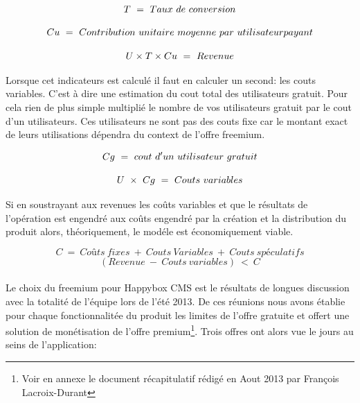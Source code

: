 \documentclass[11pt, a4paper ]{article}
\begin{document}
\begin{spacing}{1.5}
\begin{equation}\index{T!définition}
	T\ =\ Taux\ de\ conversion
\end{equation}


\begin{equation} \index{Cu!définition}
	Cu\ =\ Contribution\ unitaire\ moyenne\ par\ utilisateur payant
\end{equation}


\begin{equation}\index{Revenue!définition}
	U \times T \times Cu\ =\ Revenue
\end{equation}

Lorsque cet indicateurs est calculé il faut en calculer un second: les couts variables. C'est à dire une estimation du cout total des utilisateurs gratuit. Pour cela rien de plus simple multiplié le nombre de vos utilisateurs gratuit par le cout d'un utilisateurs. Ces utilisateurs ne sont pas des couts fixe car le montant exact de leurs utilisations dépendra du context de l'offre freemium.

\begin{equation}\index{Cg!définition}
	Cg\ =\ cout\ d'un\ utilisateur\ gratuit
\end{equation}


\begin{equation}\index{Couts variables!calcule}
	U\ \times\ Cg\ =\ Couts\ variables
\end{equation}

Si en soustrayant aux revenues les coûts variables et que le résultats de l'opération est engendré aux coûts engendré par la création et la distribution du produit alors, théoriquement, le modéle est économiquement viable.

\begin{equation}
	C\ =\ Coûts\ fixes\ +\ Couts\ Variables\ +\ Couts\ spéculatifs
\end{equation}
\begin{equation}
	(Revenue\ -\ Couts\ variables)\ <\ C
\end{equation}

\paragraph{} %
Le choix du freemium pour Happybox CMS est le résultats de longues discussion avec la totalité de l'équipe lors de l'été 2013. De ces réunions nous avons établie pour chaque fonctionnalitée du produit les limites de l'offre gratuite et offert une solution de monétisation de l'offre premium\footnote{Voir en annexe le document récapitulatif rédigé en Aout 2013 par François Lacroix-Durant}.
Trois offres ont alors vue le jours au seins de l'application:


\end{spacing}
\end{document}
